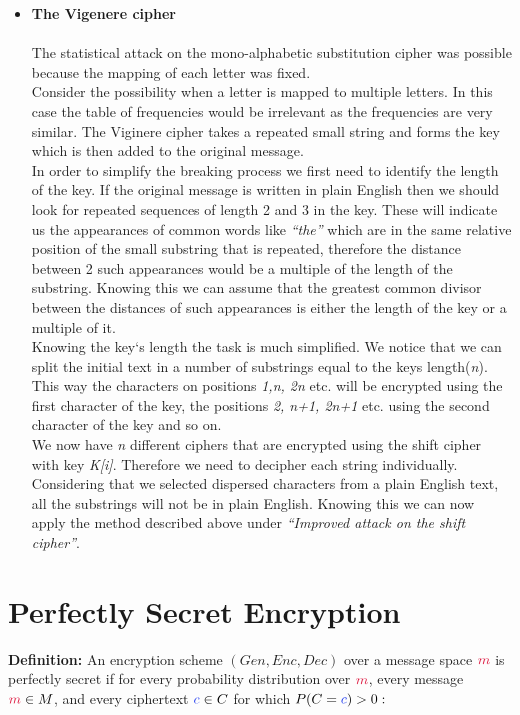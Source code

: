 \begin{itemize}
	    \item \textbf{The Vigenere cipher}\\\\
	The statistical attack on the mono-alphabetic substitution cipher was possible because the
	mapping of each letter was fixed.\\
	Consider the possibility when a letter is mapped to multiple letters. In this case the table of
	frequencies would be irrelevant as the frequencies are very similar.
	The Viginere cipher takes a repeated small string and forms the key which is then added to the
	original message.\\
	In order to simplify the breaking process we first need to identify the length of the key. If the
	original message is written in plain English then we should look for repeated sequences of length
	2 and 3 in the key. These will indicate us the appearances of common words like \textit{``the''} which
	are in the same relative position of the small substring that is repeated, therefore the distance
	between 2 such appearances would be a multiple of the length of the substring. Knowing this
	we can assume that the greatest common divisor between the distances of such appearances is
	either the length of the key or a multiple of it.\\
	Knowing the key`s length the task is much simplified. We notice that we can split the initial text
	in a number of substrings equal to the keys length(\textit{n}). This way the characters on positions \textit{1,n, 2n} etc. will be encrypted using the first character of the key, the positions \textit{2, n+1, 2n+1} etc. using the second character of the key and so on.\\
	We now have \textit{n} different ciphers that are encrypted using the shift cipher with key \textit{K[i]}.
	Therefore we need to decipher each string individually. Considering that we selected dispersed
	characters from a plain English text, all the substrings will not be in plain English. Knowing this
	we can now apply the method described above under \textit{``Improved attack on the shift cipher''}.
	\end{itemize}

\section{Perfectly Secret Encryption}
	\textbf{Definition:} An encryption scheme $(Gen,Enc,Dec)$ over a message space $\cm$ is perfectly secret if for every probability distribution over $\cm$, every message $\cm \in M$, and every ciphertext $\cc \in C$ for which $P(C=\cc)>0:$

